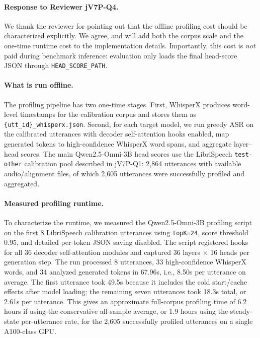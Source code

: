 \begin{answer}

    \paragraph{Response to Reviewer jV7P-Q4.}
    We thank the reviewer for pointing out that the offline profiling cost should be characterized explicitly.
    We agree, and will add both the corpus scale and the one-time runtime cost to the implementation details.
    Importantly, this cost is \emph{not} paid during benchmark inference: evaluation only loads the final head-score JSON through \texttt{HEAD\_SCORE\_PATH}.

    \paragraph{What is run offline.}
    The profiling pipeline has two one-time stages.
    First, WhisperX produces word-level timestamps for the calibration corpus and stores them as \texttt{\{utt\_id\}\_whisperx.json}.
    Second, for each target model, we run greedy ASR on the calibrated utterances with decoder self-attention hooks enabled, map generated tokens to high-confidence WhisperX word spans, and aggregate layer--head scores.
    The main Qwen2.5-Omni-3B head scores use the LibriSpeech \texttt{test-other} calibration pool described in jV7P-Q1: 2{,}864 utterances with available audio/alignment files, of which 2{,}605 utterances were successfully profiled and aggregated.

    \paragraph{Measured profiling runtime.}
    To characterize the runtime, we measured the Qwen2.5-Omni-3B profiling script on the first 8 LibriSpeech calibration utterances using \texttt{topK=24}, score threshold 0.95, and detailed per-token JSON saving disabled.
    The script registered hooks for all 36 decoder self-attention modules and captured 36 layers $\times$ 16 heads per generation step.
    The run processed 8 utterances, 33 high-confidence WhisperX words, and 34 analyzed generated tokens in 67.96s, i.e., 8.50s per utterance on average.
    The first utterance took 49.5s because it includes the cold start/cache effects after model loading; the remaining seven utterances took 18.3s total, or 2.61s per utterance.
    This gives an approximate full-corpus profiling time of 6.2 hours if using the conservative all-sample average, or 1.9 hours using the steady-state per-utterance rate, for the 2{,}605 successfully profiled utterances on a single A100-class GPU.


\end{answer}
